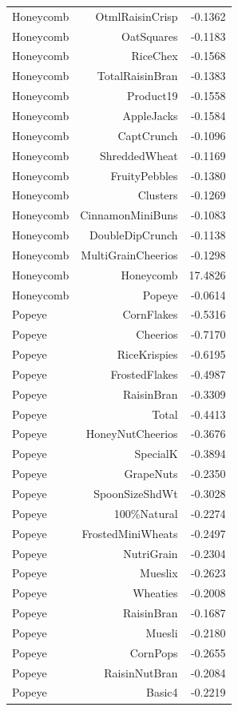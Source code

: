 \begin{longtable}{@{}lrr@{}}
Honeycomb & OtmlRaisinCrisp & -0.1362 \\
Honeycomb & OatSquares & -0.1183 \\
Honeycomb & RiceChex & -0.1568 \\
Honeycomb & TotalRaisinBran & -0.1383 \\
Honeycomb & Product19 & -0.1558 \\
Honeycomb & AppleJacks & -0.1584 \\
Honeycomb & CaptCrunch & -0.1096 \\
Honeycomb & ShreddedWheat & -0.1169 \\
Honeycomb & FruityPebbles & -0.1380 \\
Honeycomb & Clusters & -0.1269 \\
Honeycomb & CinnamonMiniBuns & -0.1083 \\
Honeycomb & DoubleDipCrunch & -0.1138 \\
Honeycomb & MultiGrainCheerios & -0.1298 \\
Honeycomb & Honeycomb & 17.4826 \\
Honeycomb & Popeye & -0.0614 \\
Popeye & CornFlakes & -0.5316 \\
Popeye & Cheerios & -0.7170 \\
Popeye & RiceKrispies & -0.6195 \\
Popeye & FrostedFlakes & -0.4987 \\
Popeye & RaisinBran & -0.3309 \\
Popeye & Total & -0.4413 \\
Popeye & HoneyNutCheerios & -0.3676 \\
Popeye & SpecialK & -0.3894 \\
Popeye & GrapeNuts & -0.2350 \\
Popeye & SpoonSizeShdWt & -0.3028 \\
Popeye & 100\%Natural & -0.2274 \\
Popeye & FrostedMiniWheats & -0.2497 \\
Popeye & NutriGrain & -0.2304 \\
Popeye & Mueslix & -0.2623 \\
Popeye & Wheaties & -0.2008 \\
Popeye & RaisinBran & -0.1687 \\
Popeye & Muesli & -0.2180 \\
Popeye & CornPops & -0.2655 \\
Popeye & RaisinNutBran & -0.2084 \\
Popeye & Basic4 & -0.2219 \\

\end{longtable}
